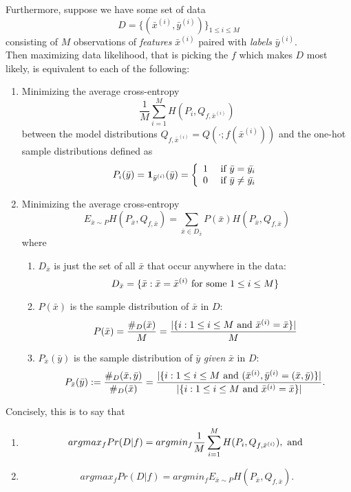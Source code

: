 \documentclass{article}
\begin{document}
\begin{itemize}
Furthermore, suppose we have some set of data $$D = \{(\bar{x}^{(i)}, \bar{y}^{(i)})\}_{1\leq i \leq M}$$ consisting of $M$ observations of \emph{features} $\bar{x}^{(i)}$ paired with \emph{labels} $\bar{y}^{(i)}$.\\

Then maximizing data likelihood, that is picking the $f$ which makes $D$ most likely, is equivalent to each of the following: 
\begin{enumerate}
\item Minimizing the average cross-entropy 
$$\frac{1}{M}\sum_{i = 1}^{M}H(P_{i}, Q_{f, \bar{x}^{(i)}})$$ between the model distributions $Q_{f, \bar{x}^{(i)}} = Q(\cdot; f(\bar{x}^{(i)}))$ and the one-hot sample distributions defined as
$$P_{i}(\bar{y})= \mathbf{1}_{\bar{y}^{(i)}}(\bar{y}) = 
\left\{ \begin{array}{ccc} 
1 & \hbox{ if } \bar{y} = \bar{y_{i}} \\ 
0 & \hbox{ if } \bar{y} \neq \bar{y_{i}}
\end{array} \right.$$
 
\item Minimizing the average cross-entropy 
$$E_{\bar{x} \sim P} H(P_{\bar{x}}, Q_{f, \bar{x}}) = \sum_{\bar{x} \in D_{\bar{x}}} P(\bar{x}) H(P_{\bar{x}}, Q_{f, \bar{x}}) $$  where \\
\begin{enumerate}
\item $D_{\bar{x}}$  is just the set of all $\bar{x}$ that occur anywhere in the data: 
$$D_{\bar{x}} = \{\bar{x} : \bar{x} = \bar{x}^{(i)} \hbox{ for some } 1\leq i \leq M\}$$ 
\item $P(\bar{x})$ is the sample distribution of $\bar{x}$ in $D$:
$$P(\bar{x}) = \frac{\#_{D}(\bar{x})}{M} =  \frac{\lvert \{ i: 1\leq i \leq M \hbox{ and } \bar{x}^{(i)} = \bar{x}\} \rvert}{M}$$
\item $P_{\bar{x}}(\bar{y})$ is the sample distribution of $\bar{y}$ \emph{given} $\bar{x}$ in $D$:
 $$P_{\bar{x}}(\bar{y}) := \frac{\#_{D}(\bar{x}, \bar{y})}{\#_{D}(\bar{x})} = \frac{\lvert \{ i: 1\leq i \leq M \hbox{ and } (\bar{x}^{(i)}, \bar{y}^{(i)} = (\bar{x}, \bar{y}) \} \rvert}{\lvert \{ i: 1\leq i \leq M \hbox{ and } \bar{x}^{(i)} = \bar{x}\} \rvert}.$$
 \end{enumerate}
 \end{enumerate}
 
 Concisely, this is to say that
 
 \begin{enumerate}
 \item $$argmax_{f} Pr(D \vert f)  = argmin_{f}\frac{1}{M}\sum_{i=1}^{M} H(P_{i}, Q_{f, \bar{x}^{(i)}}), \hbox{ and }$$
\item $$argmax_{f} Pr(D \vert f)  = argmin_{f} E_{\bar{x}\sim P} H(P_{\bar{x}}, Q_{f, \bar{x}}).$$
\end{enumerate}


\end{itemize}
\end{document}
